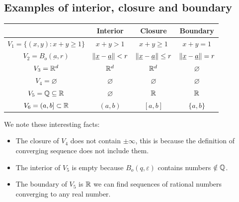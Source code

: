 \documentclass[10pt]{extarticle}
\renewcommand{\vec}[1]{\underbar{\ensuremath{#1}}}
\begin{document}
                \subsection{Examples of interior, closure and boundary}

                \begin{center}
                    \begin{tabular}{ |c|c|c|c| }
                        \hline
                                                            & Interior                                   & Closure                                       & Boundary                                   \\
                        \hline
                        $V_1 = \{ (x, y) : x + y \geq 1 \}$ & $x + y > 1$                                & $x + y \geq 1$                                & $x + y = 1$                                \\
                        $V_2 = B_o(\vec{a}, r)$       & $\norm{\vec{x} - \vec{a}} < r$ & $\norm{\vec{x} - \vec{a}} \leq r$ & $\norm{\vec{x} - \vec{a}} = r$ \\
                        $V_3 = \mathbb{R}^d$                        & $\mathbb{R}^d$                                     & $\mathbb{R}^d$                                        & $\varnothing$                              \\
                        $V_4 = \varnothing$                 & $\varnothing$                              & $\varnothing$                                 & $\varnothing$                              \\
                        $V_5 = \mathbb{Q} \subseteq \mathbb{R}$             & $\varnothing$                              & $\mathbb{R}$                                          & $\mathbb{R}$                                       \\
                        $V_6 = (a, b] \subset \mathbb{R}$           & $(a, b)$                                   & $[a, b]$                                      & $\{a, b\}$                                 \\
                        \hline
                    \end{tabular}
                \end{center}

                We note these interesting facts:
                \begin{itemize}
                    \item The closure of $V_4$ does not contain $\pm \infty$, this is because the definition of converging sequence does not include them.
                    \item The interior of $V_5$ is empty because $B_o(q, \varepsilon)$ contains numbers $\notin \mathbb{Q}$.
                    \item The boundary of $V_5$ is $\mathbb{R}$ we can find sequences of rational numbers converging to any real number.
                \end{itemize}
\end{document}
